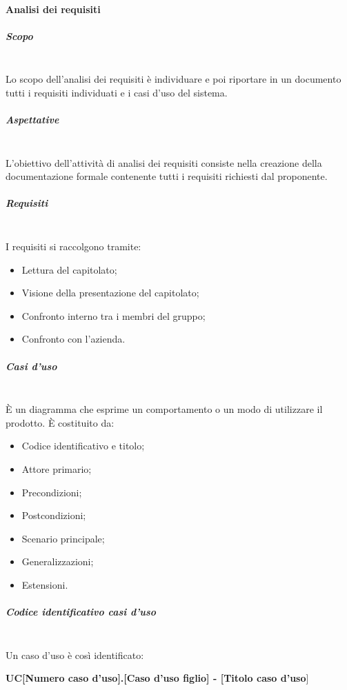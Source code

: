 \paragraph{Analisi dei requisiti}
\subparagraph{Scopo} \mbox{} \\
Lo scopo dell'analisi dei requisiti è individuare e poi riportare in un documento tutti i requisiti individuati e i casi d'uso del sistema.
\subparagraph{Aspettative} \mbox{} \\
L'obiettivo dell'attività di analisi dei requisiti consiste nella creazione della documentazione formale contenente tutti i requisiti richiesti dal proponente.
\subparagraph{Requisiti} \mbox{} \\
I requisiti si raccolgono tramite:
\begin{itemize}
\item Lettura del capitolato;
\item Visione della presentazione del capitolato;
\item Confronto interno tra i membri del gruppo;
\item Confronto con l'azienda.
\end{itemize}
\subparagraph{Casi d'uso} \mbox{} \\
È un diagramma che esprime un comportamento o un modo di utilizzare il prodotto. È costituito da:
\begin{itemize}
\item Codice identificativo e titolo;
\item Attore primario;
\item Precondizioni;
\item Postcondizioni;
\item Scenario principale;
\item Generalizzazioni;
\item Estensioni.
\end{itemize}
\subparagraph{Codice identificativo casi d'uso} \mbox{} \\
Un caso d'uso è così identificato:

\begin{center}
\textbf{UC[Numero caso d'uso].[Caso d'uso figlio] - [Titolo caso d'uso}]
\end{center}
		
